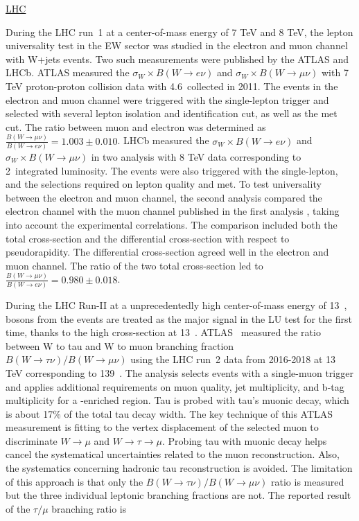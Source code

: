 


\FloatBarrier
\underline{LHC}

During the LHC run~1 at a center-of-mass energy of 7 TeV and 8 TeV, the lepton universality test in the EW sector was studied in the electron and muon channel with W+jets events. Two such measurements were published by the ATLAS and LHCb. ATLAS measured the $\sigma_W \times B(W \to e \nu)$ and $\sigma_W \times B(W \to \mu \nu)$ \cite{Aaboud:2016btc} with 7 TeV proton-proton collision data with 4.6~\fbinv collected in 2011. The events in the electron and muon channel were triggered with the single-lepton trigger and selected with several lepton isolation and identification cut, as well as the met cut. The ratio between muon and electron was determined as $\frac{ B(W  \to \mu \nu) }{ B(W \to e \nu)} = 1.003\pm 0.010$. LHCb measured the $\sigma_W \times B(W \to e \nu)$ \cite{Aaij:2016qqz} and $\sigma_W \times B(W \to \mu \nu)$ \cite{Aaij:2015zlq} in two analysis with 8 TeV data corresponding to 2~\fbinv integrated luminosity. The events were also triggered with the single-lepton, and the selections required on lepton quality and met. To test universality between the electron and muon channel, the second analysis \cite{Aaij:2016qqz} compared the electron channel with the muon channel published in the first analysis \cite{Aaij:2015zlq}, taking into account the experimental correlations. The comparison included both the total cross-section and the differential cross-section with respect to pseudorapidity. The differential cross-section agreed well in the electron and muon channel. The ratio of the two total cross-section led to $\frac{ B(W  \to \mu \nu) }{ B(W \to e \nu)}  = 0.980 \pm 0.018 $.


During the LHC Run-II at a unprecedentedly high center-of-mass energy of 13~\TeV, \PW bosons from the \ttbar events are treated as the major signal in the LU test for the first time, thanks to the high \ttbar cross-section at 13~\TeV. ATLAS~\cite{Aad:2020ayz} measured the ratio between W to tau and W to muon branching fraction $B(W  \to \tau \nu) / B(W \to \mu \nu) $ using the LHC run~2 data from 2016-2018 at 13 TeV corresponding to 139~\fbinv. The analysis selects \ttbar events with a single-muon trigger and applies additional requirements on muon quality, jet multiplicity, and b-tag multiplicity for a \ttbar-enriched region. Tau is probed with tau's muonic decay, which is about 17\% of the total tau decay width. The key technique of this ATLAS measurement is fitting to the vertex displacement of the selected muon to discriminate $W \to \mu$ and $W \to \tau \to \mu$. Probing tau with muonic decay helps cancel the systematical uncertainties related to the muon reconstruction. Also, the systematics concerning hadronic tau reconstruction is avoided. The limitation of this approach is that only the $B(W  \to \tau \nu) / B(W \to \mu \nu) $ ratio is measured but the three individual leptonic branching fractions are not. The reported result of the $\tau / \mu $ branching ratio is

